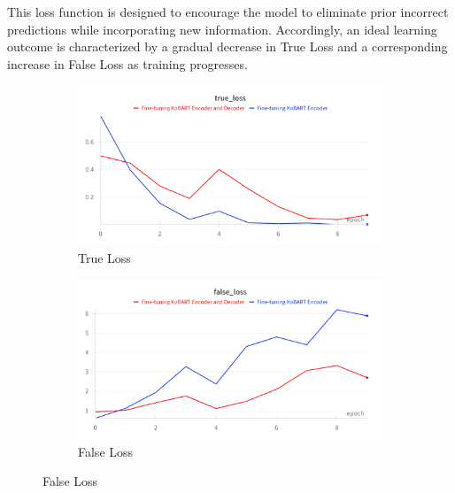 \documentclass[a4paper,fleqn]{cas-sc}
\begin{document}
This loss function is designed to encourage the model to eliminate prior incorrect predictions while incorporating new information. Accordingly, an ideal learning outcome is characterized by a gradual decrease in True Loss and a corresponding increase in False Loss as training progresses.



\begin{figure}[htbp]
    \centering
    
    \begin{subfigure}[b]{0.4\textwidth}
        \centering
        \includegraphics[width=\textwidth]{1_true_loss.png}
        \caption{True Loss}
        \label{fig:acc}
    \end{subfigure}
    \hspace{0.02\textwidth}
    \begin{subfigure}[b]{0.4\textwidth}
        \centering
        \includegraphics[width=\textwidth]{1_false_loss.png}
        \caption{False Loss}
        \label{fig:loss}
    \end{subfigure}
    

\end{figure}
\end{document}

